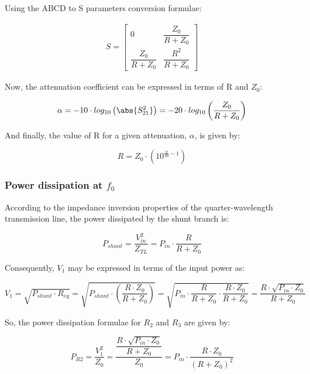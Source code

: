 \noindent Using the ABCD to S parameters conversion formulae:

\begin{gather}
 S = 
 \begin{bmatrix} 0 & \dfrac{Z_0}{R + Z_0} \\ \dfrac{Z_0}{R + Z_0} & \dfrac{R^2}{R + Z_0} \end{bmatrix}
\end{gather}


\noindent Now, the attenuation coefficient can be expressed in terms of R and $Z_0$:

\begin{equation}
\alpha = -10 \cdot log_{10} \left( \abs{S_{21}^2}\right) = -20 \cdot log_{10} \left(  \dfrac{Z_0}{R + Z_0}\right)
\end{equation}

\noindent And finally, the value of R for a given attenuation, $\alpha$, is given by:

\begin{equation}
R = Z_0 \cdot \left( 10^{\frac{\alpha}{20} - 1}\right)
\end{equation}

\subsubsection{Power dissipation at $f_0$}

\noindent According to the impedance inversion properties of the quarter-wavelength transmission line, the power dissipated by the shunt branch is:

\begin{equation}
P_{shunt} = \dfrac{V_{in}^2}{Z_{TL} } = P_{in} \cdot \dfrac{R}{R + Z_0}
\end{equation}

\noindent Consequently, $V_1$ may be expressed in terms of the input power as:

\begin{equation}
V_1 = \sqrt{P_{shunt} \cdot R_{eq}} = \sqrt{P_{shunt} \cdot \left( \dfrac{R \cdot Z_0}{R + Z_0}\right)} = \sqrt{P_{in} \cdot \dfrac{R}{R + Z_0} \cdot \dfrac{R \cdot Z_0}{R + Z_0}} = \dfrac{R \cdot \sqrt{P_{in} \cdot Z_0}}{R + Z_0}
\end{equation}

\noindent So, the power dissipation formulae for $R_2$ and $R_3$ are given by:

\begin{equation}
P_{R2} = \dfrac{V_1^2}{Z_0} = \dfrac{\dfrac{R \cdot \sqrt{P_{in} \cdot Z_0}}{R + Z_0}}{Z_0} = P_{in} \cdot \dfrac{R \cdot Z_0}{(R + Z_0)^2}
\end{equation}

